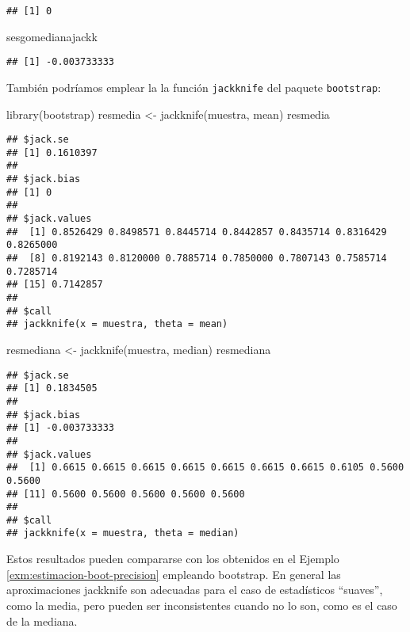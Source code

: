 \documentclass[
]{book}
\newenvironment{Shaded}{\begin{snugshade}}{\end{snugshade}}
\newcommand{\FunctionTok}[1]{\textcolor[rgb]{0.00,0.00,0.00}{#1}}
\newcommand{\NormalTok}[1]{#1}
\newcommand{\OtherTok}[1]{\textcolor[rgb]{0.56,0.35,0.01}{#1}}
\theoremstyle{break}
\theoremstyle{definition}
\theoremstyle{definition}
\theoremstyle{definition}
\theoremstyle{definition}
\theoremstyle{remark}
\begin{document}
\begin{verbatim}
## [1] 0
\end{verbatim}

\begin{Shaded}
\begin{Highlighting}[]
\NormalTok{sesgomedianajackk}
\end{Highlighting}
\end{Shaded}

\begin{verbatim}
## [1] -0.003733333
\end{verbatim}

También podríamos emplear la la función \texttt{jackknife} del paquete \texttt{bootstrap}:

\begin{Shaded}
\begin{Highlighting}[]
\FunctionTok{library}\NormalTok{(bootstrap)}
\NormalTok{resmedia }\OtherTok{\textless{}{-}} \FunctionTok{jackknife}\NormalTok{(muestra, mean)}
\NormalTok{resmedia}
\end{Highlighting}
\end{Shaded}

\begin{verbatim}
## $jack.se
## [1] 0.1610397
## 
## $jack.bias
## [1] 0
## 
## $jack.values
##  [1] 0.8526429 0.8498571 0.8445714 0.8442857 0.8435714 0.8316429 0.8265000
##  [8] 0.8192143 0.8120000 0.7885714 0.7850000 0.7807143 0.7585714 0.7285714
## [15] 0.7142857
## 
## $call
## jackknife(x = muestra, theta = mean)
\end{verbatim}

\begin{Shaded}
\begin{Highlighting}[]
\NormalTok{resmediana }\OtherTok{\textless{}{-}} \FunctionTok{jackknife}\NormalTok{(muestra, median)}
\NormalTok{resmediana}
\end{Highlighting}
\end{Shaded}

\begin{verbatim}
## $jack.se
## [1] 0.1834505
## 
## $jack.bias
## [1] -0.003733333
## 
## $jack.values
##  [1] 0.6615 0.6615 0.6615 0.6615 0.6615 0.6615 0.6615 0.6105 0.5600 0.5600
## [11] 0.5600 0.5600 0.5600 0.5600 0.5600
## 
## $call
## jackknife(x = muestra, theta = median)
\end{verbatim}

Estos resultados pueden compararse con los obtenidos en el Ejemplo \ref{exm:estimacion-boot-precision} empleando bootstrap.
En general las aproximaciones jackknife son adecuadas para el caso de estadísticos
``suaves'', como la media, pero pueden ser inconsistentes cuando no lo son,
como es el caso de la mediana.
\end{document}
